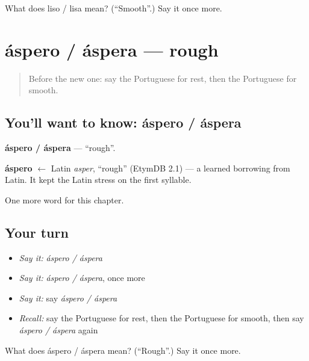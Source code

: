\begin{tcolorbox}[breakable,colback=teal!4,colframe=teal!35!black,title={Before you move on}]
What does liso / lisa mean? (\textquotedblleft{}Smooth\textquotedblright{}.) Say it once more.
\end{tcolorbox}
\section[áspero / áspera]{áspero / áspera — rough}

\label{lesson:PT-C241-aspero-aspera}



\begin{quote}
Before the new one: say the Portuguese for rest, then the Portuguese for smooth.
\end{quote}

\subsection*{You'll want to know: áspero / áspera}
\textbf{áspero / áspera} — \textquotedblleft{}rough\textquotedblright{}.

\begin{cousinweb}
\textbf{áspero} $\leftarrow$ Latin \emph{asper}, \textquotedblleft{}rough\textquotedblright{} (EtymDB 2.1) — a learned borrowing from Latin. It kept the Latin stress on the first syllable.
\end{cousinweb}

\begin{grammarlens}[title={What you've built}]
One more word for this chapter.
\end{grammarlens}

\subsection*{Your turn}
\begin{itemize}
\raggedright
  \item \emph{Say it:} \emph{áspero / áspera}
  \item \emph{Say it:} \emph{áspero / áspera}, once more
  \item \emph{Say it:} say \emph{áspero / áspera}
  \item \emph{Recall:} say the Portuguese for rest, then the Portuguese for smooth, then say \emph{áspero / áspera} again
\end{itemize}

\begin{tcolorbox}[breakable,colback=teal!4,colframe=teal!35!black,title={Before you move on}]
What does áspero / áspera mean? (\textquotedblleft{}Rough\textquotedblright{}.) Say it once more.
\end{tcolorbox}
